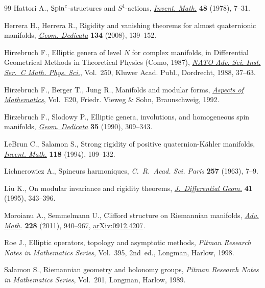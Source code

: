 \documentclass[10pt,a4paper]{amsart}
\numberwithin{equation}{section}
\begin{document}
\begin{thebibliography}{99}
Hattori A., {${\rm Spin}^{c}$}-structures and {$S^{1}$}-actions,
 \href{https://doi.org/10.1007/BF01390060}{\textit{Invent. Math.}} \textbf{48} (1978), 7--31.

Herrera H., Herrera R., Rigidity and vanishing theorems for almost quaternionic
 manifolds, \href{https://doi.org/10.1007/s10711-008-9250-4}{\textit{Geom. Dedicata}} \textbf{134} (2008), 139--152.

Hirzebruch F., Elliptic genera of level {$N$} for complex manifolds, in
 Dif\/ferential Geometrical Methods in Theoretical Physics ({C}omo, 1987),
 \href{https://doi.org/10.1007/978-94-015-7809-7_3}{\textit{NATO Adv. Sci. Inst. Ser.~C Math. Phys. Sci.}}, Vol.~250, Kluwer Acad.
 Publ., Dordrecht, 1988, 37--63.

Hirzebruch F., Berger T., Jung R., Manifolds and modular forms, \href{https://doi.org/10.1007/978-3-663-14045-0}{\textit{Aspects
 of Mathematics}}, Vol.~E20, Friedr. Vieweg \& Sohn, Braunschweig, 1992.

Hirzebruch F., Slodowy P., Elliptic genera, involutions, and homogeneous spin
 manifolds, \href{https://doi.org/10.1007/BF00147351}{\textit{Geom. Dedicata}} \textbf{35} (1990), 309--343.

LeBrun C., Salamon S., Strong rigidity of positive quaternion-{K}\"ahler
 manifolds, \href{https://doi.org/10.1007/BF01231528}{\textit{Invent. Math.}} \textbf{118} (1994), 109--132.

Lichnerowicz A., Spineurs harmoniques, \textit{C.~R.~Acad. Sci. Paris}
 \textbf{257} (1963), 7--9.

Liu K., On modular invariance and rigidity theorems, \href{https://doi.org/10.4310/jdg/1214456221}{\textit{J.~Differential
 Geom.}} \textbf{41} (1995), 343--396.

Moroianu A., Semmelmann U., Clif\/ford structure on {R}iemannian manifolds,
 \href{https://doi.org/10.1016/j.aim.2011.06.006}{\textit{Adv. Math.}} \textbf{228} (2011), 940--967, \href{http://arxiv.org/abs/0912.4207}{arXiv:0912.4207}.

Roe J., Elliptic operators, topology and asymptotic methods, \textit{Pitman
 Research Notes in Mathematics Series}, Vol.~395, 2nd~ed., Longman, Harlow,
 1998.

Salamon S., Riemannian geometry and holonomy groups, \textit{Pitman Research
 Notes in Mathematics Series}, Vol.~201, Longman, Harlow, 1989.


\end{thebibliography}
\end{document}
